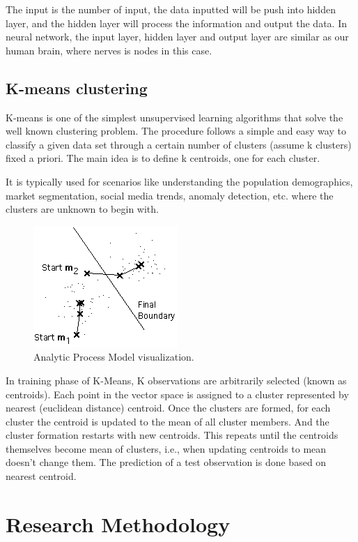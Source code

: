\documentclass[journal]{IEEEtran}
\begin{document}
The input is the number of input, the data inputted will be push into hidden layer, and the hidden layer will process the information and output the data. In neural network, the input layer, hidden layer and output layer are similar as our human brain, where nerves is nodes in this case.

\subsection{K-means clustering}
K-means \cite{MacQueen1967-ja} is one of the simplest unsupervised learning algorithms that solve the well known clustering problem. The procedure follows a simple and easy way to classify a given data set through a certain number of clusters (assume k clusters) fixed a priori. The main idea is to define k centroids, one for each cluster.

It is typically used for scenarios like understanding the population demographics, market segmentation, social media trends, anomaly detection, etc. where the clusters are unknown to begin with.

\begin{figure}[!ht]
	\centering
	\includegraphics[scale=0.5]{kmeans}
	\caption{Analytic Process Model visualization.}
\end{figure}

In training phase of K-Means, K observations are arbitrarily selected (known as centroids). Each point in the vector space is assigned to a cluster represented by nearest (euclidean distance) centroid. Once the clusters are formed, for each cluster the centroid is updated to the mean of all cluster members. And the cluster formation restarts with new centroids. This repeats until the centroids themselves become mean of clusters, i.e., when updating centroids to mean doesn’t change them. The prediction of a test observation is done based on nearest centroid.

\section{Research Methodology}
\end{document}
